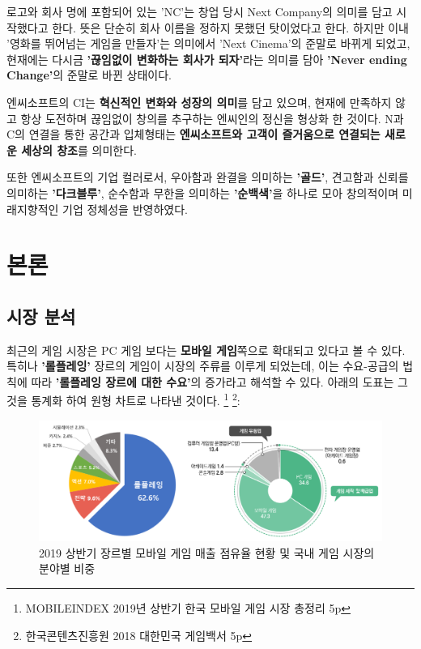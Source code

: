 \documentclass[11pt]{oblivoir}
\begin{document}
			로고와 회사 명에 포함되어 있는 'NC'는 창업 당시 Next Company의 의미를 담고 시작했다고 한다. 뜻은 단순히 회사 이름을 정하지 못했던 탓이었다고 한다. 하지만 이내 '영화를 뛰어넘는 게임을 만들자'는 의미에서 'Next Cinema'의 준말로 바뀌게 되었고, 현재에는 다시금 \textbf{'끊임없이 변화하는 회사가 되자'}라는 의미를 담아 \textbf{'Never ending Change'}의 준말로 바뀐 상태이다.
			
			엔씨소프트의 CI는 \textbf{혁신적인 변화와 성장의 의미}를 담고 있으며, 현재에 만족하지 않고 항상 도전하며 끊임없이 창의를 추구하는 엔씨인의 정신을 형상화 한 것이다. N과 C의 연결을 통한 공간과 입체형태는 \textbf{엔씨소프트와 고객이 즐거움으로 연결되는 새로운 세상의 창조}를 의미한다.
			
			또한 엔씨소프트의 기업 컬러로서, 우아함과 완결을 의미하는 \textbf{'골드'}, 견고함과 신뢰를 의미하는 \textbf{'다크블루'}, 순수함과 무한을 의미하는 \textbf{'순백색'}을 하나로 모아 창의적이며 미래지향적인 기업 정체성을 반영하였다.
			
	\section{본론}
		\subsection{시장 분석}
		최근의 게임 시장은 PC 게임 보다는 \textbf{모바일 게임}쪽으로 확대되고 있다고 볼 수 있다. 특히나 \textbf{'롤플레잉'} 장르의 게임이 시장의 주류를 이루게 되었는데, 이는 수요-공급의 법칙에 따라 \textbf{'롤플레잉 장르에 대한 수요'}의 증가라고 해석할 수 있다. 아래의 도표는 그것을 통계화 하여 원형 차트로 나타낸 것이다.
		\footnote{MOBILEINDEX 2019년 상반기 한국 모바일 게임 시장 총정리 5p}
		\footnote{한국콘텐츠진흥원 2018 대한민국 게임백서 5p}:	
			
		\begin{figure}[htbp]
			\centering
			\includegraphics[width=1\textwidth]{Pictures/marketpiechart.png}
			\caption{2019 상반기 장르별 모바일 게임 매출 점유율 현황 및 국내 게임 시장의 분야별 비중}
		\end{figure}
		
\end{document}
